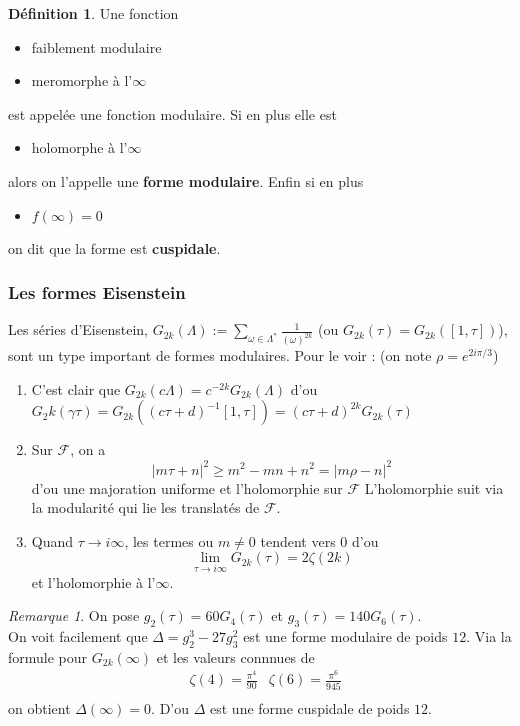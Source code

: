 \documentclass[12pt]{article}
\theoremstyle{plain}
\theoremstyle{definition}
\newtheorem{defn}[subsubsection]{D\'efinition}
\theoremstyle{remark}
\newtheorem{rem}{Remarque}
\newcommand{\w}{\omega}
\newcommand{\F}{\mathcal{F}}
\begin{document}
\begin{defn}
    Une fonction 
    \begin{itemize}
        \item faiblement modulaire
        \item meromorphe à l'$\infty$
    \end{itemize}
    est appelée une fonction modulaire. Si en plus elle est 
    \begin{itemize}
        \item holomorphe à l'$\infty$
    \end{itemize}
    alors on l'appelle une \textbf{forme modulaire}. Enfin si en plus
    \begin{itemize}
        \item $f(\infty)=0$
    \end{itemize}
    on dit que la forme est \textbf{cuspidale}.
\end{defn}

\subsubsection{Les formes Eisenstein}
Les séries d'Eisenstein, $G_{2k}(\Lambda):=\sum_{\w\in\Lambda^*}\frac{1}{(\w)^{2k}}$ (ou $G_{2k}(\tau)=G_{2k}([1,\tau])$), sont un type important de formes modulaires. Pour le voir : (on note $\rho=e^{2i\pi/3}$)
\begin{enumerate}
    \item C'est clair que $G_{2k}(c\Lambda)=c^{-2k}G_{2k}(\Lambda)$ d'ou $G_2k(\gamma\tau)=G_{2k}((c\tau+d)^{-1}[1,\tau])=(c\tau+d)^{2k}G_{2k}(\tau)$
    \item Sur $\F$, on a $$\lvert m\tau+n\rvert^2\geq m^2-mn+n^2=\lvert m\rho-n\rvert^2$$ d'ou une majoration uniforme et l'holomorphie sur $\F$
L'holomorphie suit via la modularité qui lie les translatés de $\F$.
    \item Quand $\tau\rightarrow i\infty$, les termes ou $m\ne0$ tendent vers $0$ d'ou $$\lim_{\tau\rightarrow i\infty}G_{2k}(\tau)=2\zeta(2k)$$ et l'holomorphie à l'$\infty$.
\end{enumerate}

\begin{rem}
    On pose $g_2(\tau)=60G_4(\tau)$ et $g_3(\tau)=140G_6(\tau)$.\\
    \indent On voit facilement que $\Delta=g_2^3-27g_3^2$ est une forme modulaire de poids $12$.
    Via la formule pour $G_{2k}(\infty)$ et les valeurs connnues de 
    \begin{align*}
        &\zeta(4)=\frac{\pi^4}{90} &\zeta(6)=\frac{\pi^6}{945}\\
    \end{align*} 
    on obtient $\Delta(\infty)=0$. D'ou $\Delta$ est une forme cuspidale de poids $12$.
\end{rem}
\end{document}
